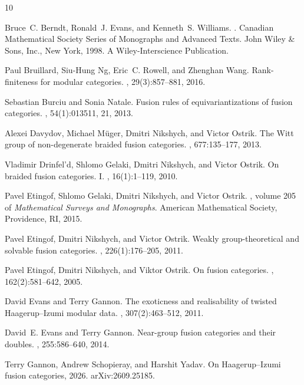 \documentclass[10pt]{article}
\theoremstyle{plain}
\theoremstyle{definition}
\theoremstyle{plain}
\begin{document}
\begin{thebibliography}{10}

Bruce~C. Berndt, Ronald~J. Evans, and Kenneth~S. Williams.
.
\newblock Canadian Mathematical Society Series of Monographs and Advanced
  Texts. John Wiley \& Sons, Inc., New York, 1998.
\newblock A Wiley-Interscience Publication.

Paul Bruillard, Siu-Hung Ng, Eric~C. Rowell, and Zhenghan Wang.
\newblock Rank-finiteness for modular categories.
, 29(3):857--881, 2016.

Sebastian Burciu and Sonia Natale.
\newblock Fusion rules of equivariantizations of fusion categories.
, 54(1):013511, 21, 2013.

Alexei Davydov, Michael M\"{u}ger, Dmitri Nikshych, and Victor Ostrik.
\newblock The {W}itt group of non-degenerate braided fusion categories.
, 677:135--177, 2013.

Vladimir Drinfel{'}d, Shlomo Gelaki, Dmitri Nikshych, and Victor Ostrik.
\newblock On braided fusion categories. {I}.
, 16(1):1--119, 2010.

Pavel Etingof, Shlomo Gelaki, Dmitri Nikshych, and Victor Ostrik.
, volume 205 of {\em Mathematical Surveys and
  Monographs}.
\newblock American Mathematical Society, Providence, RI, 2015.

Pavel Etingof, Dmitri Nikshych, and Victor Ostrik.
\newblock Weakly group-theoretical and solvable fusion categories.
, 226(1):176--205, 2011.

Pavel Etingof, Dmitri Nikshych, and Viktor Ostrik.
\newblock On fusion categories.
, 162(2):581--642, 2005.

David Evans and Terry Gannon.
\newblock The exoticness and realisability of twisted {H}aagerup--{I}zumi
  modular data.
, 307(2):463--512, 2011.

David~E. Evans and Terry Gannon.
\newblock Near-group fusion categories and their doubles.
, 255:586--640, 2014.

Terry Gannon, Andrew Schopieray, and Harshit Yadav.
\newblock On {H}aagerup--{I}zumi fusion categories, 2026.
\newblock arXiv:2609.25185.


\end{thebibliography}
\end{document}
